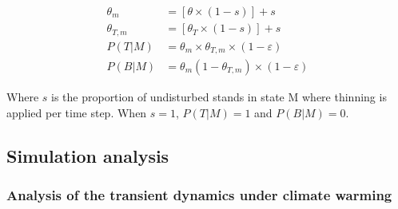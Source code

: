 \[
\begin{aligned}
  \theta_{m} &= [\theta \times (1 - s)] + s \\
  \theta_{T, m} &= [\theta_{T} \times (1 - s)] + s \\[6pt]
  P(T|M) &= \theta_m \times \theta_{T,m} \times (1 - \varepsilon) \\
  P(B|M) &= \theta_m (1 - \theta_{T,m}) \times (1 - \varepsilon)
\end{aligned}
\]

Where \(s\) is the proportion of undisturbed stands in state M where
thinning is applied per time step. When \(s=1\), \(P(T|M) = 1\) and
\(P(B|M) = 0\).

\hypertarget{simulation-analysis}{%
\subsection{Simulation analysis}\label{simulation-analysis}}

\hypertarget{analysis-of-the-transient-dynamics-under-climate-warming}{%
\subsubsection{Analysis of the transient dynamics under climate
warming}\label{analysis-of-the-transient-dynamics-under-climate-warming}}

